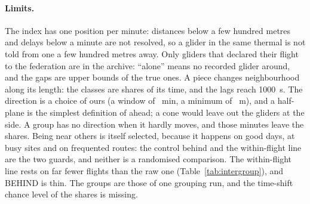 \paragraph{Limits.} The index has one position per minute: distances below a few hundred metres and delays below a minute are not resolved, so a glider in the same thermal is not told from one a few hundred metres away. Only gliders that declared their flight to the federation are in the archive: ``alone'' means no recorded glider around, and the gaps are upper bounds of the true ones. A piece changes neighbourhood along its length: the classes are shares of its time, and the lags reach 1000~s. The direction is a choice of ours (a window of \IgTDir~min, a minimum of \IgMinDisp~m), and a half-plane is the simplest definition of ahead; a cone would leave out the gliders at the side. A group has no direction when it hardly moves, and those minutes leave the shares. Being near others is itself selected, because it happens on good days, at busy sites and on frequented routes: the control behind and the within-flight line are the two guards, and neither is a randomised comparison. The within-flight line rests on far fewer flights than the raw one (Table~\ref{tab:intergroup}), and BEHIND is thin. The groups are those of one grouping run, and the time-shift chance level of the shares is missing.

